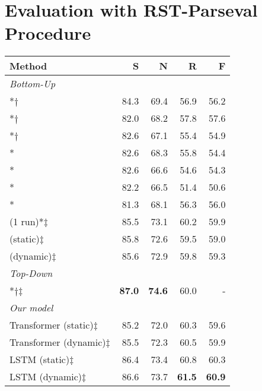 \documentclass[11pt,a4paper]{article}
\newcommand{\sentfeat}{\ensuremath{\dagger}}
\newcommand{\parafeat}{\ensuremath{\ddagger}}
\begin{document}
\section{Evaluation with RST-Parseval Procedure}
\label{sec:appendix_res}
\begin{table}[h]
	\begin{center}
		\begin{adjustbox}{max width=0.9\linewidth}
			\begin{tabular}{lrrrr}
				\toprule
				\textbf{Method} & \textbf{S} & \textbf{N} & \textbf{R} & \textbf{F} \\
				\midrule
				\multicolumn{5}{l}{\textit{Bottom-Up}}\\
				\citet{feng-hirst-2014-linear}*\sentfeat & 84.3 & 69.4 & 56.9 &
				56.2 \\
				\citet{ji-eisenstein-2014-representation}*\sentfeat & 82.0 & 68.2 &
				57.8 & 57.6 \\
				\citet{surdeanu-etal-2015-two}*\sentfeat & 82.6 & 67.1 & 55.4 &
				54.9 \\
				\citet{joty-etal-2015-codra}* & 82.6 & 68.3 & 55.8 &
				54.4 \\
				\citet{hayashi-etal-2016-empirical}* & 82.6 & 66.6 & 54.6 & 54.3 \\
				\citet{li-etal-2016-discourse}* & 82.2 & 66.5 & 51.4 & 50.6 \\
				\citet{braud-etal-2017-cross-lingual}* & 81.3 & 68.1 & 56.3 & 56.0 \\
				\citet{yu2018transition} (1 run)*\parafeat & 85.5 & 73.1 & 60.2 & 59.9 \\
				\citet{yu2018transition} (static)\parafeat  & 85.8 & 72.6 & 59.5 & 59.0 \\
				\citet{yu2018transition} (dynamic)\parafeat & 85.6 & 72.9 & 59.8 & 59.3 \\
				\midrule
				\multicolumn{5}{l}{\textit{Top-Down}}\\
\citet{kobayashi2020top}*\sentfeat\parafeat & \textbf{87.0} & \textbf{74.6} & 60.0 & - \\
				\midrule
				\multicolumn{5}{l}{\textit{Our model}}\\
				Transformer (static)\parafeat & 85.2 & 72.0 & 60.3 & 59.6 \\
				Transformer (dynamic)\parafeat & 85.5 & 72.3 & 60.5 & 59.9 \\
				LSTM (static)\parafeat & 86.4 & 73.4 & 60.8 & 60.3 \\
				LSTM (dynamic)\parafeat & 86.6 & 73.7 & \textbf{61.5} & \textbf{60.9} \\

\end{tabular}
\end{adjustbox}
\end{center}
\end{table}
\end{document}
